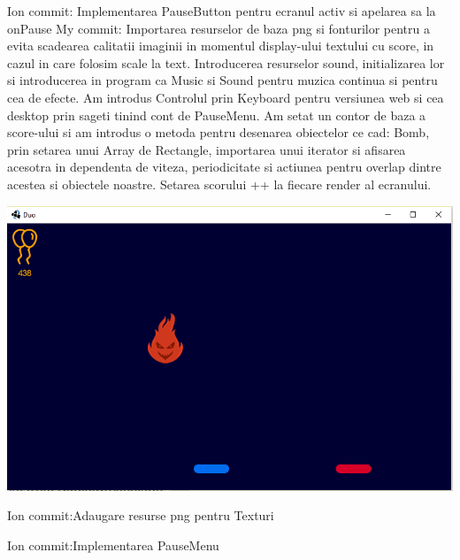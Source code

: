 \newline \newline 
Ion commit: Implementarea PauseButton pentru ecranul activ si apelarea sa la onPause
\newline \newline
My commit: Importarea resurselor de baza png si fonturilor pentru a evita scadearea calitatii imaginii in momentul display-ului textului cu score, in cazul in care folosim scale la text. Introducerea resurselor sound, initializarea lor si introducerea in program ca Music si Sound pentru muzica continua si pentru cea de efecte. Am introdus Controlul prin Keyboard pentru versiunea web si cea desktop prin sageti tinind cont de PauseMenu. Am setat un contor de baza a score-ului si am introdus o metoda pentru desenarea obiectelor ce cad: Bomb, prin setarea unui Array de Rectangle, importarea unui iterator si afisarea acesotra in dependenta de viteza, periodicitate si actiunea pentru overlap dintre acestea si obiectele noastre. Setarea scorului ++ la fiecare render al ecranului.
\begin{center}
\includegraphics[width=0.7\linewidth]{screenshot006}
\end{center}

\newline \newline
Ion commit:Adaugare resurse png pentru Texturi 

\newline \newline
Ion commit:Implementarea PauseMenu

